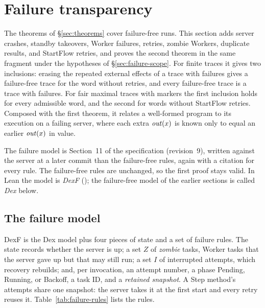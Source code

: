 \section{Failure transparency}
\label{sec:failures}

The theorems of \S\ref{sec:theorems} cover failure-free runs. This
section adds server crashes, standby takeovers, Worker failures, retries,
zombie Workers, duplicate results, and StartFlow retries, and proves the
second theorem in the same fragment under the hypotheses of
\S\ref{sec:failure-scope}. For finite traces it gives two inclusions:
erasing the repeated external effects of a trace with failures gives a
failure-free trace for the word without retries, and every failure-free
trace is a trace with failures. For fair maximal traces with markers the
first inclusion holds for every admissible word, and the second for words
without StartFlow retries. Composed with the first theorem, it relates a
well-formed \Lang{} program to its execution on a failing server, where
each extra $\mathit{out}(x)$ is known only to equal an earlier $\mathit{out}(x)$
in value.

The failure model is Section~11 of the specification (revision~9), written
against the server at a later commit than the failure-free rules, again
with a citation for every rule. The failure-free rules are unchanged, so
the first proof stays valid. In Lean the model is \emph{DexF}
(); the failure-free model of the earlier sections is called
\emph{Dex} below.

\subsection{The failure model}
\label{sec:failure-model}

DexF is the Dex model plus four pieces of state and a set of failure rules.
The state records whether the server is up; a set $Z$ of \emph{zombie}
tasks, Worker tasks that the server gave up but that may still run; a set
$I$ of interrupted attempts, which recovery rebuilds; and, per invocation,
an attempt number, a phase Pending, Running, or Backoff, a task ID, and a
\emph{retained snapshot}. A Step method's attempts share one snapshot: the
server takes it at the first start and every retry reuses it.
Table~\ref{tab:failure-rules} lists the rules.

